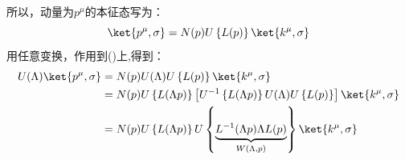所以，动量为$p^\mu$的本征态写为：
\begin{equation}\label{4.10}
    \ket{p^\mu,\sigma}=N(p)U\left\{L(p)\right\}\ket{k^\mu,\sigma}
\end{equation}
用任意变换，作用到()上,得到：
\begin{equation}\label{4.11}
      \begin{aligned}
        U(\Lambda)\ket{p^\mu,\sigma}&=
        N(p)U(\Lambda)U\left\{L(p)\right\}\ket{k^\mu,\sigma}\\
        &=  N(p)U\left\{L(\Lambda p)\right\}\left[U^{-1}\left\{L(\Lambda p)\right\}U(\Lambda)U\left\{L(p)\right\}\right]\ket{k^\mu,\sigma}\\
        &= N(p)U\left\{L(\Lambda p)\right\}U\left\{\underbrace{L^{-1}(\Lambda p)\Lambda L(p)}_{W(\Lambda,p)\text{}}\right\}\ket{k^\mu,\sigma}\\
    \end{aligned}
\end{equation}

